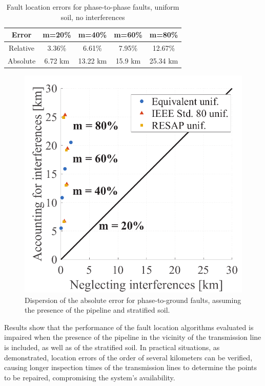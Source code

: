 \documentclass[conference]{IEEEtran}
\begin{document}
	\begin{table}[!hbt]
		\renewcommand{\arraystretch}{1.3}
		\caption{Fault location errors for phase-to-phase faults, uniform soil, no interferences}
		\label{table:Err_StratInt}
		\centering
		\begin{tabular}{|c|c|c|c|c|}
			\hline
			\textbf{Error} & \textbf{m=20\%} & \textbf{m=40\%} & \textbf{m=60\%} & \textbf{m=80\%}\\
			\hline
			Relative & 3.36\% & 6.61\%  & 7.95\%  & 12.67\%\\
			\hline
			Absolute & 6.72 km & 13.22 km & 15.9 km & 25.34 km\\
			\hline
		\end{tabular}
	\end{table}
	
	
	\begin{figure}[hbt]
		\begin{center}
			\includegraphics[width=.7\columnwidth]{./fig/dispersao2.pdf}
			\caption{Dispersion of the absolute error for phase-to-ground faults, assuming the presence of the pipeline and stratified soil.}
			\label{fig:ErrDispersion}
		\end{center}
	\end{figure}
	
	Results show that the performance of the fault location algorithms evaluated is impaired when the presence of the pipeline in the vicinity of the transmission line is included, as well as of the stratified soil. In practical situations, as demonstrated, location errors of the order of several kilometers can be verified, causing longer inspection times of the transmission lines to determine the points to be repaired, compromising the system's availability.
	
\end{document}
